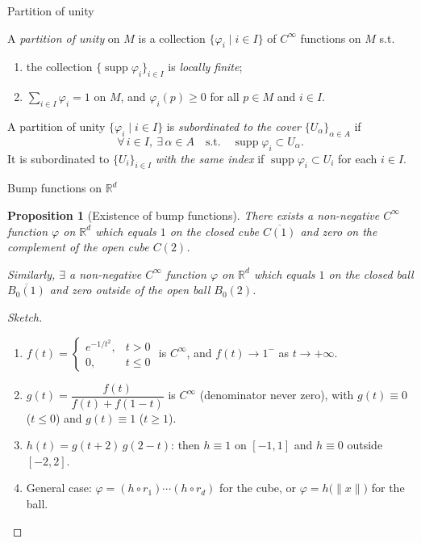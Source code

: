 \documentclass[10pt]{beamer}
\newtheorem{proposition}{Proposition}
\newcommand{\R}{\mathbb{R}}
\newcommand{\supp}{\operatorname{supp}}
\begin{document}
\begin{frame}{Partition of unity}
	\begin{definition}
		A \emph{partition of unity} on $M$ is a collection
		$\{\varphi_i \mid i \in I\}$ of $C^\infty$ functions on $M$ s.t.
		\begin{enumerate}
			\item[(a)] the collection $\{\supp \varphi_i\}_{i \in I}$ is
			      \emph{locally finite};
			\item[(b)] $\displaystyle\sum_{i \in I} \varphi_i = 1$ on $M$, and
			      $\varphi_i(p) \geq 0$ for all $p \in M$ and $i \in I$.
		\end{enumerate}
	\end{definition}
	\begin{definition}[Subordination]
		A partition of unity $\{\varphi_i \mid i \in I\}$ is
		\emph{subordinated to the cover} $\{U_\alpha\}_{\alpha \in A}$ if
		\[
			\forall\, i \in I,\ \exists\, \alpha \in A \quad \text{s.t.}\quad
			\supp \varphi_i \subset U_\alpha .
		\]
		It is subordinated to $\{U_i\}_{i \in I}$ \emph{with the same index}
		if $\supp \varphi_i \subset U_i$ for each $i \in I$.
	\end{definition}
\end{frame}

\begin{frame}{Bump functions on $\R^d$}
	\begin{proposition}[Existence of bump functions]
		There exists a non-negative $C^\infty$ function $\varphi$ on $\R^d$
		which equals $1$ on the closed cube $\overline{C(1)}$ and zero on the
		complement of the open cube $C(2)$.
		\par\smallskip
		Similarly, $\exists$ a non-negative $C^\infty$ function $\varphi$ on
		$\R^d$ which equals $1$ on the closed ball $\overline{B_0(1)}$ and
		zero outside of the open ball $B_0(2)$.
	\end{proposition}
	\begin{proof}[Sketch]
		\begin{enumerate}
			\item $f(t) = \begin{cases} e^{-1/t^2}, & t > 0 \\ 0, & t \leq 0 \end{cases}$
			      is $C^\infty$, and $f(t) \to 1^{-}$ as $t \to +\infty$.
			\item $g(t) = \dfrac{f(t)}{f(t) + f(1-t)}$ is $C^\infty$
			      (denominator never zero), with $g(t) \equiv 0$ ($t \leq 0$)
			      and $g(t) \equiv 1$ ($t \geq 1$).
			\item $h(t) = g(t+2)\, g(2-t)$: then $h \equiv 1$ on $[-1, 1]$ and
			      $h \equiv 0$ outside $[-2, 2]$.
			\item General case: $\varphi = (h \circ r_1) \cdots (h \circ r_d)$
			      for the cube, or $\varphi = h\bigl(\|x\|\bigr)$ for the ball.
		\end{enumerate}
	\end{proof}
\end{frame}
\end{document}
